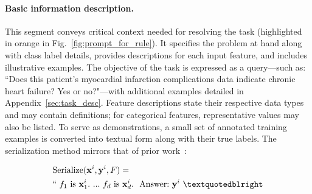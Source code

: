 \vspace*{-0.12in}
\paragraph{Basic information description.} This segment conveys critical context needed for resolving the task (highlighted in orange in Fig.~\ref{fig:prompt_for_rule}). It specifies the problem at hand along with class label details, provides descriptions for each input feature, and includes illustrative examples. The objective of the task is expressed as a query—such as: ``Does this patient's myocardial infarction complications data indicate chronic heart failure? Yes or no?"—with additional examples detailed in Appendix~\ref{sec:task_desc}. Feature descriptions state their respective data types and may contain definitions; for categorical features, representative values may also be listed. To serve as demonstrations, a small set of annotated training examples is converted into textual form along with their true labels. The serialization method mirrors that of prior work~\cite{dinh2022lift,hegselmann2023tabllm}:

\begin{align}
&\text{Serialize}(\mathbf{x}^i,\mathbf{y}^i, F) = \nonumber \\ 
&``\ f_1\ \text{is}\ \mathbf{x}^i_1.\ ... \ f_d\  \text{is}\  \mathbf{x}^i_d.\ \ \text{Answer:}\  \mathbf{y}^i\ ”
\end{align}

\vspace*{-0.12in}
